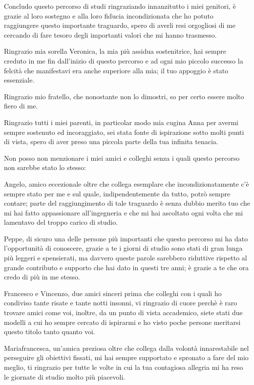 \thispagestyle{empty}

Concludo questo percorso di studi ringraziando innanzitutto i miei genitori, è grazie al loro sostegno e alla loro fiducia incondizionata che ho potuto raggiungere questo importante traguardo, spero di averli resi orgogliosi di me cercando di fare tesoro degli importanti valori che mi hanno trasmesso.
 
\medskip
Ringrazio mia sorella Veronica, la mia più assidua sostenitrice, hai sempre creduto in me fin dall'inizio di questo percorso e ad ogni mio  piccolo successo la felcità che manifestavi era anche superiore alla mia; il tuo appoggio è stato essenziale.

\medskip
Ringrazio mio fratello, che nonostante non lo dimostri, so per certo essere molto fiero di me.

\medskip
Ringrazio tutti i miei parenti, in particolar modo mia cugina Anna per avermi sempre sostenuto ed incoraggiato, sei stata fonte di ispirazione sotto molti punti di vista, spero di aver preso una piccola parte della tua infinita tenacia.

\medskip
Non posso non menzionare i miei amici e colleghi senza i quali questo percorso non sarebbe stato lo stesso:

\medskip
Angelo, amico eccezionale oltre che collega esemplare che incondizionatamente c'è sempre stato per me e sul quale, indipendentemente da tutto, potrò sempre contare; parte del raggiungimento di tale traguardo è senza dubbio merito tuo che mi hai fatto appassionare all'ingegneria e che mi hai ascoltato ogni volta che mi lamentavo del troppo carico di studio.

\medskip
Peppe, di sicuro una delle persone più importanti che questo percorso mi ha dato l'opportunità di conoscere,  grazie a te i giorni di studio sono stati di gran lunga più leggeri e spensierati, ma davvero queste parole sarebbero
riduttive rispetto al grande contributo e supporto che hai dato in questi tre anni; è grazie a te che ora credo di più in me stesso.

\medskip
Francesco e Vincenzo, due amici sinceri prima che colleghi con i quali ho condiviso tante risate e tante notti insonni, vi ringrazio di cuore perchè è raro trovare amici come voi, inoltre, da un punto di vista accademico, siete stati due modelli a cui ho sempre cercato di ispirarmi e ho visto poche persone meritarsi questo titolo tanto quanto voi.

\newpage    
\thispagestyle{empty}
\medskip
Mariafrancesca, un'amica preziosa oltre che collega dalla volontà innarestabile nel perseguire gli obiettivi fissati, mi hai sempre supportato e spronato a fare del mio meglio, ti ringrazio per tutte le volte in cui la tua contagiosa allegria mi ha reso le giornate di studio molto più piacevoli.


